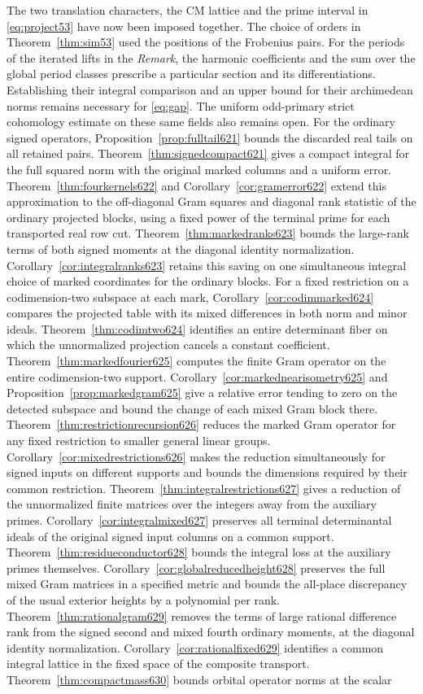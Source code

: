\documentclass[a4paper,11pt]{article}
\theoremstyle{definition}
\theoremstyle{remark}
\numberwithin{equation}{section}
\begin{document}
The two translation characters, the CM lattice and the prime interval
in \eqref{eq:project53} have now been imposed together. The choice of
orders in Theorem~\ref{thm:sim53} used the positions of the Frobenius
pairs. For the periods of the iterated lifts in the \emph{Remark},
the harmonic coefficients and the sum over the global period classes
prescribe a particular section and its differentiations. Establishing
their integral comparison and an upper bound for their archimedean
norms remains necessary for \eqref{eq:gap}. The uniform odd-primary
strict cohomology estimate on these same fields also remains open. For the ordinary signed operators, Proposition~\ref{prop:fulltail621} bounds the discarded real tails on all retained pairs. Theorem~\ref{thm:signedcompact621} gives a compact integral for the full squared norm with the original marked columns and a uniform error. Theorem~\ref{thm:fourkernels622} and Corollary~\ref{cor:gramerror622} extend this approximation to the off-diagonal Gram squares and diagonal rank statistic of the ordinary projected blocks, using a fixed power of the terminal prime for each transported real row cut. Theorem~\ref{thm:markedranks623} bounds the large-rank terms of both signed moments at the diagonal identity normalization. Corollary~\ref{cor:integralranks623} retains this saving on one simultaneous integral choice of marked coordinates for the ordinary blocks. For a fixed restriction on a codimension-two subspace at each mark, Corollary~\ref{cor:codimmarked624} compares the projected table with its mixed differences in both norm and minor ideals. Theorem~\ref{thm:codimtwo624} identifies an entire determinant fiber on which the unnormalized projection cancels a constant coefficient. Theorem~\ref{thm:markedfourier625} computes the finite Gram operator on the entire codimension-two support. Corollary~\ref{cor:markednearisometry625} and Proposition~\ref{prop:markedgram625} give a relative error tending to zero on the detected subspace and bound the change of each mixed Gram block there. Theorem~\ref{thm:restrictionrecursion626} reduces the marked Gram operator for any fixed restriction to smaller general linear groups. Corollary~\ref{cor:mixedrestrictions626} makes the reduction simultaneously for signed inputs on different supports and bounds the dimensions required by their common restriction. Theorem~\ref{thm:integralrestrictions627} gives a reduction of the unnormalized finite matrices over the integers away from the auxiliary primes. Corollary~\ref{cor:integralmixed627} preserves all terminal determinantal ideals of the original signed input columns on a common support. Theorem~\ref{thm:residueconductor628} bounds the integral loss at the auxiliary primes themselves. Corollary~\ref{cor:globalreducedheight628} preserves the full mixed Gram matrices in a specified metric and bounds the all-place discrepancy of the usual exterior heights by a polynomial per rank. Theorem~\ref{thm:rationalgram629} removes the terms of large rational difference rank from the signed second and mixed fourth ordinary moments, at the diagonal identity normalization. Corollary~\ref{cor:rationalfixed629} identifies a common integral lattice in the fixed space of the composite transport. Theorem~\ref{thm:compactmass630} bounds orbital operator norms at the scalar 
\end{document}
